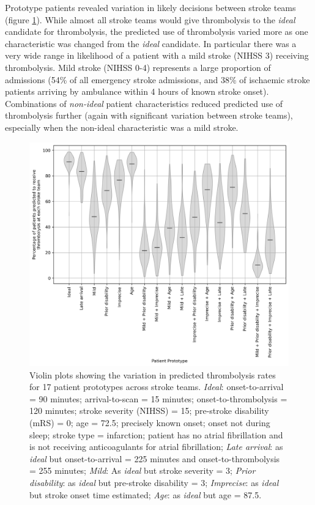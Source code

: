 Prototype patients revealed variation in likely decisions between stroke teams (figure \ref{fig:thrombolysis_rates_prototype_patients}). While almost all stroke teams would give thrombolysis to the \textit{ideal} candidate for thrombolysis, the predicted use of thrombolysis varied more as one characteristic was changed from the \textit{ideal} candidate. In particular there was a very wide range in likelihood of a patient with a mild stroke (NIHSS 3) receiving thrombolysis. Mild stroke (NIHSS 0-4) represents a large proportion of admissions (54\% of all emergency stroke admissions, and 38\% of ischaemic stroke patients arriving by ambulance within 4 hours of known stroke onset). Combinations of \textit{non-ideal} patient characteristics reduced predicted use of thrombolysis further (again with significant variation between stroke teams), especially when the non-ideal characteristic was a mild stroke.

\begin{figure}
    \centering
    \includegraphics[width=0.75\linewidth]{images/prototype_patients_all_teams}
    \caption{Violin plots showing the variation in predicted thrombolysis rates for 17 patient prototypes across stroke teams. \textit{Ideal}: onset-to-arrival = 90 minutes; arrival-to-scan = 15 minutes; onset-to-thrombolysis = 120 minutes; stroke severity (NIHSS) = 15; pre-stroke disability (mRS) = 0; age = 72.5; precisely known onset; onset not during sleep; stroke type = infarction; patient has no atrial fibrillation and is not receiving anticoagulants for atrial fibrillation; \textit{Late arrival}: as \textit{ideal} but onset-to-arrival = 225 minutes and onset-to-thrombolysis = 255 minutes; \textit{Mild}: As \textit{ideal} but stroke severity = 3; \textit{Prior disability}: as \textit{ideal} but pre-stroke disability = 3; \textit{Imprecise}: as \textit{ideal} but stroke onset time estimated; \textit{Age}: as \textit{ideal} but age = 87.5.}
    \label{fig:thrombolysis_rates_prototype_patients}
\end{figure}

